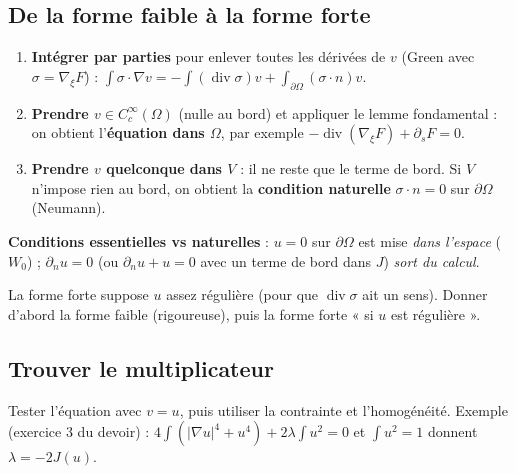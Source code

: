 \documentclass[10pt,a4paper]{article}
\renewcommand{\div}{\operatorname{div}}
\begin{document}
\subsection{De la forme faible à la forme forte}\label{sec:forte}
\begin{methode}
\begin{enumerate}
\item \textbf{Intégrer par parties} pour enlever toutes les dérivées de $v$ (Green avec $\sigma=\nabla_\xi F$) :
$\int\sigma\cdot\nabla v=-\int(\div\sigma)v+\int_{\partial\Omega}(\sigma\cdot n)v$.
\item \textbf{Prendre $v\in C^\infty_c(\Omega)$} (nulle au bord) et appliquer le lemme fondamental : on obtient l'\textbf{équation dans $\Omega$}, par exemple $-\div(\nabla_\xi F)+\partial_sF=0$.
\item \textbf{Prendre $v$ quelconque dans $V$} : il ne reste que le terme de bord. Si $V$ n'impose rien au bord, on obtient la \textbf{condition naturelle} $\sigma\cdot n=0$ sur $\partial\Omega$ (Neumann).
\end{enumerate}
\textbf{Conditions essentielles vs naturelles} : $u=0$ sur $\partial\Omega$ est mise \emph{dans l'espace} ($W_0$) ; $\partial_nu=0$ (ou $\partial_nu+u=0$ avec un terme de bord dans $J$) \emph{sort du calcul}.
\end{methode}
\begin{piege}
La forme forte suppose $u$ assez régulière (pour que $\div\sigma$ ait un sens). Donner d'abord la forme faible (rigoureuse), puis la forme forte « si $u$ est régulière ».
\end{piege}

\subsection{Trouver le multiplicateur}\label{sec:mult}
Tester l'équation avec $v=u$, puis utiliser la contrainte et l'homogénéité.
Exemple (exercice 3 du devoir) : $4\int(|\nabla u|^4+u^4)+2\lambda\int u^2=0$ et $\int u^2=1$ donnent $\lambda=-2J(u)$.
\end{document}
